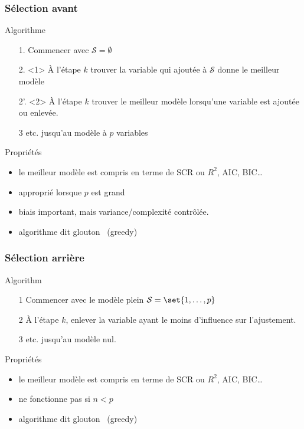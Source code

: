 \documentclass{beamer}\usepackage[]{graphicx}\usepackage[]{color}
\begin{document}
\begin{frame}
  \frametitle{Sélection avant  }

  \begin{block}{Algorithme}
    \begin{itemize}
    \item[1.] Commencer avec $\mathcal{S} = \emptyset$
    \item[2.]<1> À l'étape $k$ trouver la variable qui ajoutée à $\mathcal{S}$
      donne le meilleur modèle
    \item[2'.]<2> À l'étape $k$ trouver le meilleur modèle lorsqu'une
      variable est ajoutée ou enlevée.
    \item[3] etc. jusqu'au modèle à $p$ variables
    \end{itemize}
  \end{block}
  
  \vfill
  
  \begin{block}{Propriétés}
    \begin{itemize}
    \item le meilleur modèle est compris en terme de SCR ou $R^2$,
      AIC, BIC\dots
    \item approprié lorsque $p$ est grand
    \item biais important, mais variance/complexité contrôlée.
    \item algorithme dit \og glouton \fg\ (greedy)
    \end{itemize}
  \end{block}

\end{frame}

\begin{frame}
  \frametitle{Sélection arrière}

  \begin{block}{Algorithm}
    \begin{enumerate}
    \item[1] Commencer avec le modèle plein $\mathcal{S} = \set{1,\dots,p}$
    \item[2]  À  l'étape   $k$,  enlever  la  variable   ayant  le  moins
      d'influence sur l'ajustement.
    \item[3] etc. jusqu'au modèle nul.
    \end{enumerate}
  \end{block}
  
  \vfill
  
  \begin{block}{Propriétés}
    \begin{itemize}
    \item le meilleur modèle est compris en terme de SCR ou $R^2$,
      AIC, BIC\dots
    \item ne fonctionne pas si $n <p$
    \item algorithme dit \og glouton \fg\ (greedy)
    \end{itemize}
  \end{block}

\end{frame}
\end{document}
